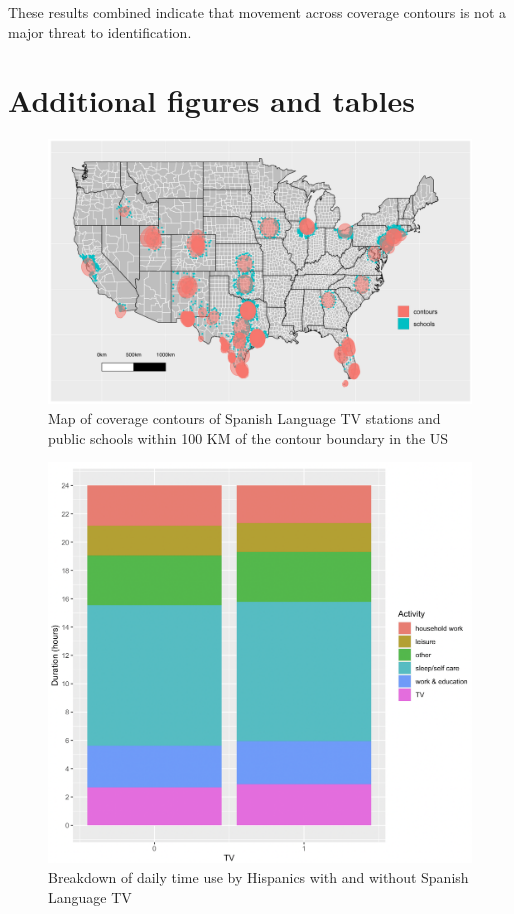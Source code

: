 \documentclass[11pt]{article}
\begin{document}
These results combined indicate that movement across coverage contours is not a major threat to identification. 


\clearpage

\section{Additional figures and tables}

\begin{figure}[!hbtp]
\centering
\caption{Map of coverage contours of Spanish Language TV stations and public schools within 100 KM of the contour boundary in the US}\label{f:contours_schools_inside}
\includegraphics[width=14.4cm]{../../analysis/Output/img/Schools_inside2.pdf}
\end{figure} 

\begin{figure}[!hbtp]
\centering
\caption{Breakdown of daily time use by Hispanics with and without Spanish Language TV}\label{f:atus_breakdown}
\includegraphics[width=14.4cm]{../../analysis/Output/graphs/time_breakdown.png}
\end{figure} 
\end{document}
